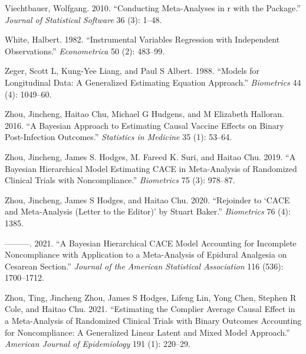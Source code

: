 \begin{CSLReferences}{1}{0}
\leavevmode{}%
Viechtbauer, Wolfgang. 2010. {``Conducting Meta-Analyses in {r} with the  Package.''} \emph{Journal of Statistical Software} 36 (3): 1--48.

\leavevmode{}%
White, Halbert. 1982. {``Instrumental Variables Regression with Independent Observations.''} \emph{Econometrica} 50 (2): 483--99.

\leavevmode{}%
Zeger, Scott L, Kung-Yee Liang, and Paul S Albert. 1988. {``Models for Longitudinal Data: A Generalized Estimating Equation Approach.''} \emph{Biometrics} 44 (4): 1049--60.

\leavevmode{}%
Zhou, Jincheng, Haitao Chu, Michael G Hudgens, and M Elizabeth Halloran. 2016. {``A Bayesian Approach to Estimating Causal Vaccine Effects on Binary Post-Infection Outcomes.''} \emph{Statistics in Medicine} 35 (1): 53--64.

\leavevmode{}%
Zhou, Jincheng, James S. Hodges, M. Fareed K. Suri, and Haitao Chu. 2019. {``A Bayesian Hierarchical Model Estimating CACE in Meta-Analysis of Randomized Clinical Trials with Noncompliance.''} \emph{Biometrics} 75 (3): 978--87.

\leavevmode{}%
Zhou, Jincheng, James S Hodges, and Haitao Chu. 2020. {``Rejoinder to `CACE and Meta-Analysis (Letter to the Editor)' by Stuart Baker.''} \emph{Biometrics} 76 (4): 1385.

\leavevmode{}%
---------. 2021. {``A Bayesian Hierarchical CACE Model Accounting for Incomplete Noncompliance with Application to a Meta-Analysis of Epidural Analgesia on Cesarean Section.''} \emph{Journal of the American Statistical Association} 116 (536): 1700--1712.

\leavevmode{}%
Zhou, Ting, Jincheng Zhou, James S Hodges, Lifeng Lin, Yong Chen, Stephen R Cole, and Haitao Chu. 2021. {``Estimating the Complier Average Causal Effect in a Meta-Analysis of Randomized Clinical Trials with Binary Outcomes Accounting for Noncompliance: A Generalized Linear Latent and Mixed Model Approach.''} \emph{American Journal of Epidemiology} 191 (1): 220--29.

\end{CSLReferences}

